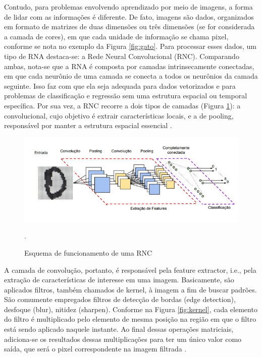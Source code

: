 Contudo, para problemas envolvendo aprendizado por meio de imagens, a forma de lidar com as informações é diferente. De fato, imagens são dados, organizados em formato de matrizes de duas dimensões ou três dimensões (se for considerada a camada de cores), em que cada unidade de informação se chama pixel, conforme se nota no exemplo da Figura \ref{fig:gato}. Para processar esses dados, um tipo de RNA destaca-se: a Rede Neural Convolucional (RNC). Comparando ambas, nota-se que a RNA é composta por camadas intrinsecamente conectadas, em que cada neurônio de uma camada se conecta a todos os neurônios da camada seguinte. Isso faz com que ela seja adequada para dados vetorizados e para problemas de classificação e regressão sem uma estrutura espacial ou temporal específica. Por sua vez, a RNC recorre a dois tipos de camadas (Figura \ref{fig:rnc}): a convolucional, cujo objetivo é extrair características locais, e a de pooling, responsável por manter a estrutura espacial essencial \cite{vargas2016estudo}. 

\begin{figure}[!h]
    \centering
    \begin{minipage}{0.9\linewidth}
    \centering
    \captionsetup{justification=centering,margin=0.5cm,font=small}
    \includegraphics[width=0.7\linewidth]{img/cap2/cnn.jpeg}
    \caption{Esquema de funcionamento de uma RNC \cite{vargas2016estudo}}.
    \label{fig:rnc}
    \end{minipage}
\end{figure}

A camada de convolução, portanto, é responsável pela feature extractor, i.e., pela extração de características de interesse em uma imagem. Basicamente, são aplicados filtros, também chamados de kernel, à imagem a fim de buscar padrões. São comumente empregados filtros de detecção de bordas (edge detection), desfoque (blur), nitidez (sharpen). Conforme na Figura \ref{fig:kernel}, cada elemento do filtro é multiplicado pelo elemento de mesma posição na região em que o filtro está sendo aplicado naquele instante. Ao final dessas operações matriciais, adiciona-se os resultados dessas multiplicações para ter um único valor como saída, que será o pixel correspondente na imagem filtrada \cite{rodrigues2023visao} . 

